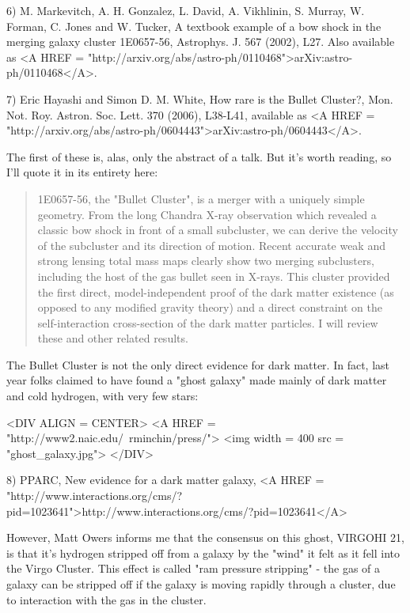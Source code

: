 6) M. Markevitch, A. H. Gonzalez, L. David, A. Vikhlinin, S. Murray,
W. Forman, C. Jones and W. Tucker, A textbook example of a bow shock
in the merging galaxy cluster 1E0657-56, Astrophys. J. 567 (2002),
L27.  Also available as <A HREF =
"http://arxiv.org/abs/astro-ph/0110468">arXiv:astro-ph/0110468</A>.

7) Eric Hayashi and Simon D. M. White, How rare is the Bullet
Cluster?, Mon. Not. Roy. Astron. Soc. Lett. 370 (2006), L38-L41,
available as <A HREF =
"http://arxiv.org/abs/astro-ph/0604443">arXiv:astro-ph/0604443</A>.

The first of these is, alas, only the abstract of a talk.  
But it's worth reading, so I'll quote it in its entirety here:

\begin{quote}
1E0657-56, the "Bullet Cluster", is a merger with a uniquely 
simple geometry. From the long Chandra X-ray observation which revealed 
a classic bow shock in front of a small subcluster, we can derive the 
velocity of the subcluster and its direction of motion. Recent accurate 
weak and strong lensing total mass maps clearly show two merging subclusters, 
including the host of the gas bullet seen in X-rays. This cluster provided 
the first direct, model-independent proof of the dark matter existence 
(as opposed to any modified gravity theory) and a direct constraint on 
the self-interaction cross-section of the dark matter particles. I will 
review these and other related results.
\end{quote}

The Bullet Cluster is not the only direct evidence for dark 
matter.  In fact, last year folks claimed to have found
a "ghost galaxy" made mainly of dark matter
and cold hydrogen, with very few stars:

<DIV ALIGN = CENTER>
<A HREF = "http://www2.naic.edu/~rminchin/press/">
<img width = 400 src = "ghost_galaxy.jpg">
</DIV>

8) PPARC, New evidence for a dark matter galaxy, 
<A HREF = "http://www.interactions.org/cms/?pid=1023641">http://www.interactions.org/cms/?pid=1023641</A>

However, Matt Owers informs me that the consensus on this
ghost, VIRGOHI 21, is that it's hydrogen stripped off
from a galaxy by the "wind" it felt as 
it fell into the Virgo Cluster.  This effect is called 
"ram pressure stripping" - the gas of a galaxy can be
stripped off if the galaxy is moving rapidly through a cluster, due 
to interaction with the gas in the cluster.

